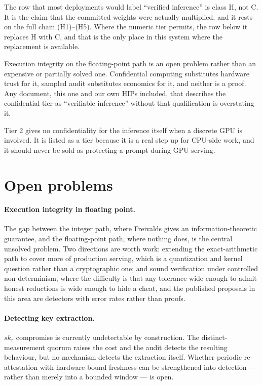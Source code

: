 \documentclass[11pt]{article}
\begin{document}
The row that most deployments would label ``verified inference'' is class H, not C. It is the claim
that the committed weights were actually multiplied, and it rests on the full chain
(H1)--(H5). Where the numeric tier permits, the row below it replaces H with C, and that is the only
place in this system where the replacement is available.

Execution integrity on the floating-point path is an open problem rather than an expensive or
partially solved one. Confidential computing substitutes hardware trust for it, sampled audit
substitutes economics for it, and neither is a proof. Any document, this one and our own HIPs
included, that describes the confidential tier as ``verifiable inference'' without that
qualification is overstating it.

Tier 2 gives no confidentiality for the inference itself when a discrete GPU is involved. It is
listed as a tier because it is a real step up for CPU-side work, and it should never be sold as
protecting a prompt during GPU serving.

\section{Open problems}

\paragraph{Execution integrity in floating point.}
The gap between the integer path, where Freivalds gives an information-theoretic guarantee, and the
floating-point path, where nothing does, is the central unsolved problem. Two directions are worth
work: extending the exact-arithmetic path to cover more of production serving, which is a
quantization and kernel question rather than a cryptographic one; and sound verification under
controlled non-determinism, where the difficulty is that any tolerance wide enough to admit honest
reductions is wide enough to hide a cheat, and the published proposals in this area are detectors
with error rates rather than proofs.

\paragraph{Detecting key extraction.}
$sk_r$ compromise is currently undetectable by construction. The distinct-measurement quorum raises the cost
and the audit detects the resulting behaviour, but no mechanism detects the extraction itself.
Whether periodic re-attestation with hardware-bound freshness can be strengthened into detection ---
rather than merely into a bounded window --- is open.
\end{document}
